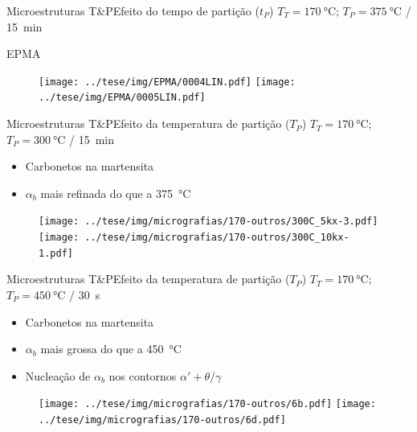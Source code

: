 \begin{frame}{Microestruturas T\&P}{Efeito do tempo de partição ($t_P$)}
  $T_T = \SI{170}{\degreeCelsius}$; $T_P = \SI{375}{\degreeCelsius}$ / \SI{15}{min}
  
  EPMA
  
  \begin{figure}
    \texttt{[image: ../tese/img/EPMA/0004LIN.pdf]}\hfill
    \texttt{[image: ../tese/img/EPMA/0005LIN.pdf]}
  \end{figure}
\end{frame}



\begin{frame}{Microestruturas T\&P}{Efeito da temperatura de partição ($T_P$)}
  $T_T = \SI{170}{\degreeCelsius}$; $T_P = \SI{300}{\degreeCelsius}$ / \SI{15}{min}

  \begin{itemize}
    \item Carbonetos na martensita
    \item $\alpha_b$ mais refinada do que a \SI{375}{\degreeCelsius}
  \end{itemize}

  \begin{figure}
    \texttt{[image: ../tese/img/micrografias/170-outros/300C\_5kx-3.pdf]}\hfill
    \texttt{[image: ../tese/img/micrografias/170-outros/300C\_10kx-1.pdf]}
  \end{figure}
\end{frame}

\begin{frame}{Microestruturas T\&P}{Efeito da temperatura de partição ($T_P$)}
  $T_T = \SI{170}{\degreeCelsius}$; $T_P = \SI{450}{\degreeCelsius}$ / \SI{30}{s}

  \begin{itemize}
    \item Carbonetos na martensita
    \item $\alpha_b$ mais grossa do que a \SI{450}{\degreeCelsius}
    \item Nucleação de $\alpha_b$ nos contornos $\alpha' + \theta / \gamma$
  \end{itemize}

  \begin{figure}
    \texttt{[image: ../tese/img/micrografias/170-outros/6b.pdf]}\hfill
    \texttt{[image: ../tese/img/micrografias/170-outros/6d.pdf]}
  \end{figure}
\end{frame}

